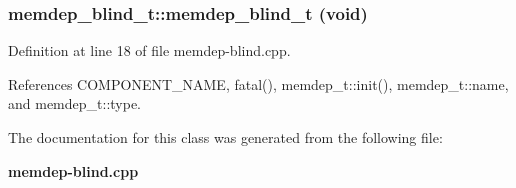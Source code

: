 \subsubsection[{memdep\_\-blind\_\-t}]{\setlength{\rightskip}{0pt plus 5cm}memdep\_\-blind\_\-t::memdep\_\-blind\_\-t (void)\hspace{0.3cm}{\tt  [inline]}}\label{classmemdep__blind__t_d519d2feb87669a124d8533364e8d2f1}




Definition at line 18 of file memdep-blind.cpp.

References COMPONENT\_\-NAME, fatal(), memdep\_\-t::init(), memdep\_\-t::name, and memdep\_\-t::type.

The documentation for this class was generated from the following file:\begin{CompactItemize}
\item 
{\bf memdep-blind.cpp}\end{CompactItemize}

